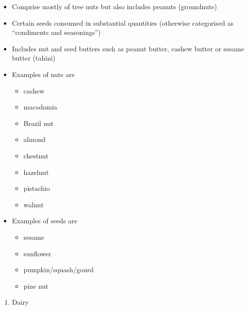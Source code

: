 \documentclass[12pt,]{book}
\providecommand{\tightlist}{%
  \setlength{\itemsep}{0pt}\setlength{\parskip}{0pt}}
\theoremstyle{definition}
\theoremstyle{definition}
\theoremstyle{definition}
\theoremstyle{remark}
\begin{document}
\begin{itemize}
\tightlist
\item
  Comprise mostly of tree nuts but also includes peanuts (groundnuts)
\item
  Certain seeds consumed in substantial quantities (otherwise
  categorised as ``condiments and seasonings'')
\item
  Includes nut and seed butters such as peanut butter, cashew butter or
  sesame butter (tahini)
\item
  Examples of nuts are

  \begin{itemize}
  \tightlist
  \item
    cashew
  \item
    macadamia
  \item
    Brazil nut
  \item
    almond
  \item
    chestnut
  \item
    hazelnut
  \item
    pistachio
  \item
    walnut
  \end{itemize}
\item
  Examples of seeds are

  \begin{itemize}
  \tightlist
  \item
    sesame
  \item
    sunflower
  \item
    pumpkin/squash/gourd
  \item
    pine nut
  \end{itemize}
\end{itemize}

\begin{enumerate}
\def\labelenumi{\arabic{enumi}.}
\setcounter{enumi}{3}
\tightlist
\item
  Dairy
\end{enumerate}
\end{document}
